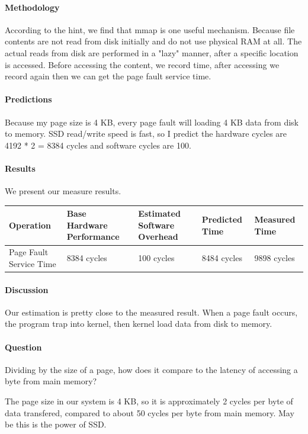 \paragraph{Methodology}
According to the hint, we find that mmap is one useful mechanism. Because file contents are not read from disk initially and do not use physical RAM at all. The actual reads from disk are performed in a "lazy" manner, after a specific location is accessed. Before accessing the content, we record time, after accessing we record again then we can get the page fault service time.

\paragraph{Predictions}
Because my page size is 4 KB, every page fault will loading 4 KB data from disk to memory. SSD read/write speed is fast, so I predict the hardware cycles are 4192 * 2 = 8384 cycles and software cycles are 100.

\paragraph{Results}
We present our measure results.

\begin{center}
\begin{tabular}{| p{3cm} | p{3cm} | p{3cm} | p{3cm} | p{3cm} |}
Operation  & Base Hardware Performance  & Estimated Software Overhead  & Predicted Time  & Measured Time   \\
\hline
Page Fault Service Time & 8384 cycles& 100 cycles& 8484 cycles& 9898 cycles\\

\end{tabular}
\end{center}

\paragraph{Discussion}
Our estimation is pretty close to the measured result. When a page fault occurs, the program trap into kernel, then kernel load data from disk to memory. 

\paragraph{Question} Dividing by the size of a page, how does it compare to the latency of accessing a byte from main memory?

The page size in our system is 4 KB, so it is approximately 2 cycles per byte of data transfered, compared to about 50 cycles per byte from main memory. May be this is the power of SSD.
